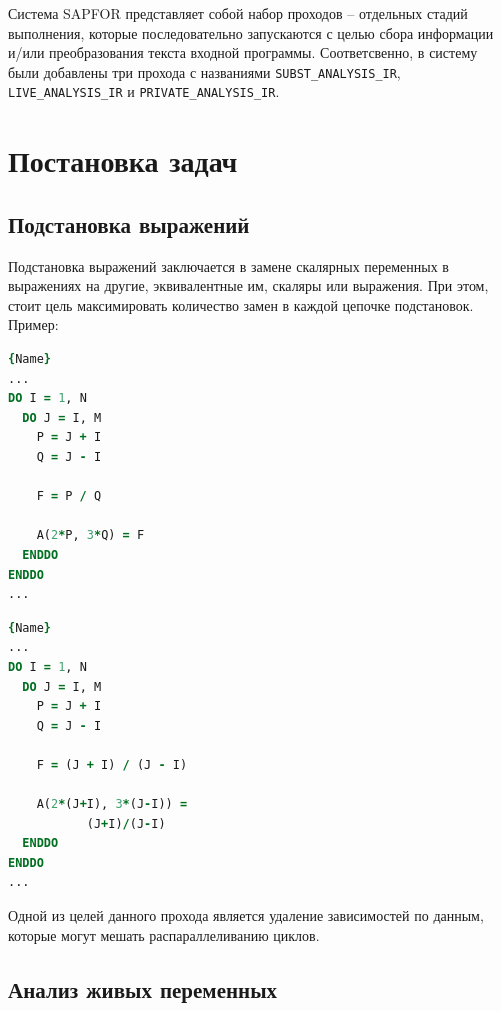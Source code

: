 \documentclass{article}
\begin{document}
Система SAPFOR представляет собой набор проходов -- отдельных стадий выполнения, 
которые последовательно запускаются с целью сбора информации и/или преобразования текста входной программы.
Соответсвенно, в систему были добавлены три прохода с названиями \texttt{SUBST\_ANALYSIS\_IR}, \texttt{LIVE\_ANALYSIS\_IR} и \texttt{PRIVATE\_ANALYSIS\_IR}.

\section{Постановка задач}

\subsection{Подстановка выражений}
Подстановка выражений заключается в замене скалярных переменных в выражениях на другие, эквивалентные им, 
скаляры или выражения. При этом, стоит цель максимировать количество замен в каждой цепочке подстановок.
\\[3mm]
Пример:
\\

\noindent\begin{minipage}{.45\textwidth}
    \begin{lstlisting}[language=Fortran, caption=До подстановки,frame=shadowbox]{Name}
...
DO I = 1, N
  DO J = I, M
    P = J + I
    Q = J - I

    F = P / Q

    A(2*P, 3*Q) = F        
  ENDDO
ENDDO
...
\end{lstlisting}
\end{minipage}\hfill
\begin{minipage}{.45\textwidth}
    \begin{lstlisting}[language=Fortran, caption=После подстановки,frame=shadowbox]{Name}
...
DO I = 1, N
  DO J = I, M
    P = J + I
    Q = J - I

    F = (J + I) / (J - I)

    A(2*(J+I), 3*(J-I)) = 
           (J+I)/(J-I)      
  ENDDO
ENDDO
...
\end{lstlisting}
\end{minipage}


Одной из целей данного прохода является удаление зависимостей по данным, которые могут мешать распараллеливанию циклов.


\subsection{Анализ живых переменных}
\end{document}
